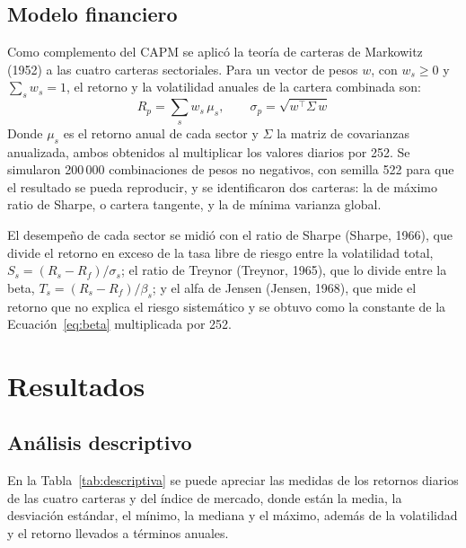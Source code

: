 \documentclass[12pt]{article}
\begin{document}
\subsection{Modelo financiero}
Como complemento del CAPM se aplicó la teoría de carteras de Markowitz (1952) a las cuatro carteras sectoriales. Para un vector de pesos $w$, con $w_s \geq 0$ y $\sum_s w_s = 1$, el retorno y la volatilidad anuales de la cartera combinada son:
\begin{equation}
R_p = \sum_{s} w_s\, \mu_s, \qquad \sigma_p = \sqrt{w^{\top} \Sigma\, w}
\label{eq:markowitz}
\end{equation}
\noindent Donde $\mu_s$ es el retorno anual de cada sector y $\Sigma$ la matriz de covarianzas anualizada, ambos obtenidos al multiplicar los valores diarios por 252. Se simularon 200\,000 combinaciones de pesos no negativos, con semilla 522 para que el resultado se pueda reproducir, y se identificaron dos carteras: la de máximo ratio de Sharpe, o cartera tangente, y la de mínima varianza global.

El desempeño de cada sector se midió con el ratio de Sharpe (Sharpe, 1966), que divide el retorno en exceso de la tasa libre de riesgo entre la volatilidad total, $S_s = (R_s - R_f)/\sigma_s$; el ratio de Treynor (Treynor, 1965), que lo divide entre la beta, $T_s = (R_s - R_f)/\beta_s$; y el alfa de Jensen (Jensen, 1968), que mide el retorno que no explica el riesgo sistemático y se obtuvo como la constante de la Ecuación~\ref{eq:beta} multiplicada por 252.

\section{Resultados}
\subsection{Análisis descriptivo}
En la Tabla~\ref{tab:descriptiva} se puede apreciar las medidas de los retornos diarios de las cuatro carteras y del índice de mercado, donde están la media, la desviación estándar, el mínimo, la mediana y el máximo, además de la volatilidad y el retorno llevados a términos anuales.
\end{document}
